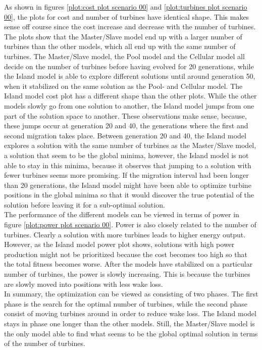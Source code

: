 \noindent As shown in figures \ref{plot:cost plot scenario 00} and \ref{plot:turbines plot scenario 00}, the plots for cost and number of turbines have identical shape. This makes sense off course since the cost increase and decrease with the number of turbines. The plots show that the Master/Slave model end up with a larger number of turbines than the other models, which all end up with the same number of turbines. The Master/Slave model, the Pool model and the Cellular model all decide on the number of turbines before having evolved for 20 generations, while the Island model is able to explore different solutions until around generation 50, when it stabilized on the same solution as the Pool- and Cellular model. The Island model cost plot has a different shape than the other plots. While the other models slowly go from one solution to another, the Island model jumps from one part of the solution space to another. These observations make sense, because, these jumps occur at generation 20 and 40, the generations where the first and second migration takes place. Between generation 20 and 40, the Island model explores a solution with the same number of turbines as the Master/Slave model, a solution that seem to be the global minima, however, the Island model is not able to stay in this minima, because it observes that jumping to a solution with fewer turbines seems more promising. If the migration interval had been longer than 20 generations, the Island model might have been able to optimize turbine positions in the global minima so that it would discover the true potential of the solution before leaving it for a sub-optimal solution.\\


\noindent The performance of the different models can be viewed in terms of power in figure \ref{plot:power plot scenario 00}. Power is also closely related to the number of turbines. Clearly a solution with more turbines leads to higher energy output. However, as the Island model power plot shows, solutions with high power production might not be prioritized because the cost becomes too high so that the total fitness becomes worse. After the models have stabilized on a particular number of turbines, the power is slowly increasing. This is because the turbines are slowly moved into positions with less wake loss. \\


\noindent In summary, the optimization can be viewed as consisting of two phases. The first phase is the search for the optimal number of turbines, while the second phase consist of moving turbines around in order to reduce wake loss. The Island model stays in phase one longer than the other models. Still, the Master/Slave model is the only model able to find what seems to be the global optimal solution in terms of the number of turbines. \\

